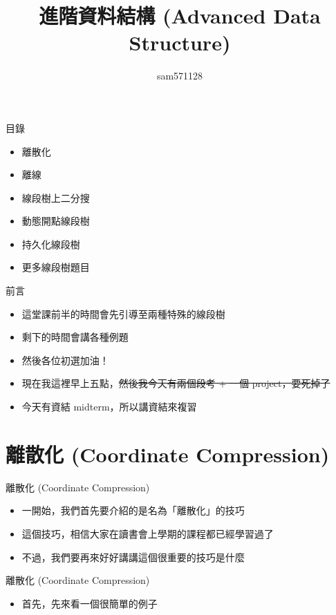 \documentclass[aspectratio=169]{beamer}
\title{進階資料結構 (Advanced Data Structure)}
\author{sam571128}
\date[附中延平競程讀書會]
\begin{document}
    \begin{frame}
        \titlepage
    \end{frame}
    
    \begin{frame}{目錄}
        \begin{itemize}
            \item 離散化
            \item 離線
            \item 線段樹上二分搜
            \item 動態開點線段樹
            \item 持久化線段樹
            \item 更多線段樹題目
        \end{itemize}
    \end{frame}

    \begin{frame}{前言}
        \begin{itemize}
            \item 這堂課前半的時間會先引導至兩種特殊的線段樹
            \item 剩下的時間會講各種例題
            \item 然後各位初選加油！
            \item 現在我這裡早上五點，\sout{然後我今天有兩個段考 + 一個 project，要死掉了}
            \item 今天有資結 midterm，所以講資結來複習
        \end{itemize}
    \end{frame}

    \section{離散化 (Coordinate Compression)}

    \begin{frame}{離散化 (Coordinate Compression)}
        \begin{itemize}
            \item 一開始，我們首先要介紹的是名為「離散化」的技巧
            \item 這個技巧，相信大家在讀書會上學期的課程都已經學習過了
            \item 不過，我們要再來好好講講這個很重要的技巧是什麼
        \end{itemize}
    \end{frame}

    \begin{frame}{離散化 (Coordinate Compression)}
        \begin{itemize}
            \item 首先，先來看一個很簡單的例子
        \end{itemize}
    \end{frame}
\end{document}

